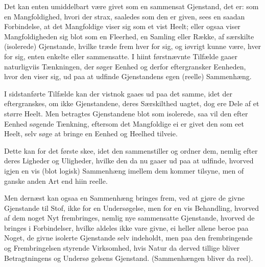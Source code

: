 \documentclass[12pt]{book}
\def\textit#1{#1}%
\def\emph#1{#1}%
\newcommand{\opage}[1]{\marginnote{\footnotesize\textit{[#1]}}}
\begin{document}
Det kan enten umiddelbart være givet som en sammensat Gjenstand, det er: som
en Mangfoldighed, hvori der strax, saaledes som den er given, sees en saadan
Forbindelse, at det Mangfoldige viser sig som et vist \emph{Heelt}; eller
ogsaa viser Mangfoldigheden sig blot som en \emph{Fleerhed}, en Samling eller
Række, af særskilte (isolerede) Gjenstande, hvilke træde frem hver for sig,
og iøvrigt kunne være, hver for sig, enten enkelte eller sammensatte.
\opage{28} I hiint førstnævnte Tilfælde gaaer naturligviis Tænkningen, der søger Eenhed
og derfor eftergransker Eenheden, hvor den viser sig, ud paa at udfinde
Gjenstandens egen (reelle) Sammenhæng.

I sidstanførte Tilfælde kan der vistnok gaaes ud paa det samme, idet der
eftergranskes, om ikke Gjenstandene, deres Særskilthed uagtet, dog ere Dele
af et større Heelt. Men betragtes Gjenstandene blot som isolerede, saa vil
den efter Eenhed søgende Tænkning, eftersom det Mangfoldige ei er givet den
som eet Heelt, selv søge at bringe en Eenhed og Heelhed tilveie.

Dette kan for det første skee, idet den sammenstiller og ordner dem, nemlig
efter deres \emph{Ligheder og Uligheder}, hvilke den da nu gaaer ud paa at
udfinde, hvorved igjen en vis (blot logisk) Sammenhæng imellem dem kommer
tilsyne, men of ganske anden Art end hiin reelle.

Men dernæst kan ogsaa en Sammenhæng bringes frem, ved at gjøre de givne
Gjenstande til \emph{Stof}, ikke for en \emph{Undersøgelse}, men for en vis
\emph{Behandling}, hvorved af dem noget Nyt frembringes, nemlig nye
sammensatte Gjenstande, hvorved de bringes i Forbindelser, hvilke aldeles
ikke vare givne, ei heller allene beroe paa Noget, de givne isolerte
Gjenstande selv indeholdt, men paa den frembringende og Frembringelsen
styrende Virksomhed, hvis Natur da derved tillige bliver Betragtningens og
Undersø%
\opage{29}gelsens Gjenstand. (Sammenhængen bliver da reel).
\end{document}
